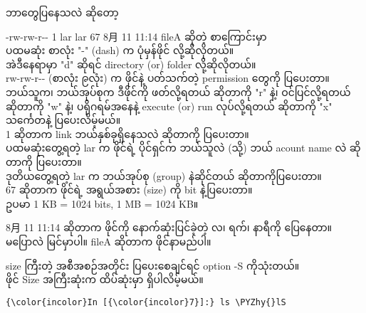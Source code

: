 \documentclass[11pt]{article}
\def\PYZhy{\char`\-}
\begin{document}
    ဘာတွေပြနေသလဲ ဆိုတော့

-rw-rw-r-\/- 1 lar lar 67 8月 11 11:14 fileA ဆိုတဲ့ စာကြောင်းမှာ\\
ပထမဆုံး စာလုံး "-" (dash) က ပုံမှန်ဖိုင် လို့ဆိုလိုတယ်။\\
အဲဒီနေရာမှာ "d" ဆိုရင် directory (or) folder လို့ဆိုလိုတယ်။\\
rw-rw-r-\/- (စာလုံး ၉လုံး) က ဖိုင်နဲ့ ပတ်သက်တဲ့ permission တွေကို
ပြပေးတာ။\\
ဘယ်သူက၊ ဘယ်အုပ်စုက ဒီဖိုင်ကို ဖတ်လို့ရတယ် ဆိုတာကို "r" နဲ့၊
ဝင်ပြင်လို့ရတယ် ဆိုတာကို "w" နဲ့၊ ပရိုဂရမ်အနေနဲ့ execute (or) run
လုပ်လို့ရတယ် ဆိုတာကို "x" သင်္ကေတနဲ့ ပြပေးလိမ့်မယ်။\\
1 ဆိုတာက link ဘယ်နှစ်ခုရှိနေသလဲ ဆိုတာကို ပြပေးတာ။\\
ပထမဆုံးတွေ့ရတဲ့ lar က ဖိုင်ရဲ့ ပိုင်ရှင်က ဘယ်သူလဲ (သို့) ဘယ် acount name
လဲ ဆိုတာကို ပြပေးတာ။\\
ဒုတိယတွေ့ရတဲ့ lar က ဘယ်အုပ်စု (group) နဲဆိုင်တယ် ဆိုတာကိုပြပေးတာ။\\
67 ဆိုတာက ဖိုင်ရဲ့ အရွယ်အစား (size) ကို bit နဲ့ပြပေးတာ။\\
ဥပမာ 1 KB = 1024 bits, 1 MB = 1024 KB။

8月 11 11:14 ဆိုတာက ဖိုင်ကို နောက်ဆုံးပြင်ခဲ့တဲ့ လ၊ ရက်၊ နာရီကို
ပြေနေတာ။\\
မပြောလဲ မြင်မှာပါ။ fileA ဆိုတာက ဖိုင်နာမည်ပါ။

    size ကြီးတဲ့ အစီအစဉ်အတိုင်း ပြပေးစေချင်ရင် option -S ကိုသုံးတယ်။\\
ဖိုင် Size အကြီးဆုံးက ထိပ်ဆုံးမှာ ရှိပါလိမ့်မယ်။

    \begin{Verbatim}[commandchars=\\\{\}]
{\color{incolor}In [{\color{incolor}7}]:} ls \PYZhy{}lS
\end{Verbatim}
\end{document}
